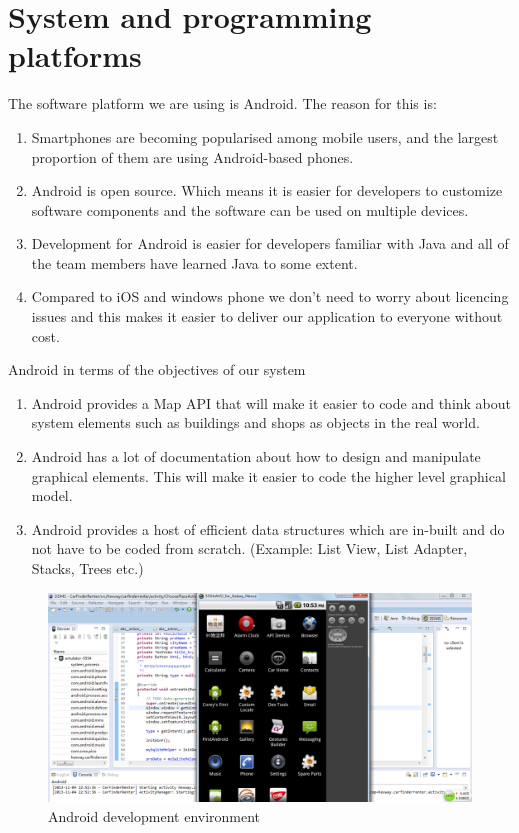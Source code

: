 \documentclass[10pt,a4paper,oneside]{report}
\begin{document}
\section*{System and programming platforms}
The software platform we are using is Android.  The reason for this is:
\begin{enumerate}
\item{Smartphones are becoming popularised among mobile users, and the largest proportion of them are using Android-based phones.}
\item{Android is open source. Which means it is easier for developers to customize software components and the software can be used on multiple devices.}
\item{Development for Android is easier for developers familiar with Java and all of the team members have learned Java to some extent.}
\item{Compared to iOS and windows phone we don't need to worry about licencing issues and this makes it easier to deliver our application to everyone without cost.}
\end{enumerate}
Android in terms of the objectives of our system
\begin{enumerate}
\item{Android provides a Map API that will make it easier to code and think about system elements such as buildings and shops as objects in the real world.}
\item{Android has a lot of documentation about how to design and manipulate graphical elements. This will make it easier to code the higher level graphical model.}
\item{Android provides a host of efficient data structures which are in-built and do not have to be coded from scratch. (Example: List View, List Adapter, Stacks, Trees etc.)}
\end{enumerate}

\begin{figure}[H]
 \centering
 \includegraphics[keepaspectratio, width=\textwidth]{androiddev.png}
 \caption{Android development environment}
\end{figure}
\end{document}
